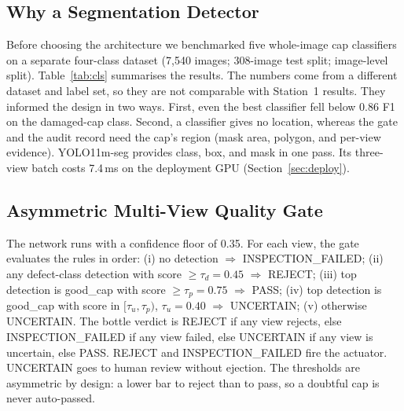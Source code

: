 \documentclass[conference]{IEEEtran}
\begin{document}
\subsection{Why a Segmentation Detector}
Before choosing the architecture we benchmarked five whole-image cap classifiers on a separate four-class dataset (7{,}540 images; 308-image test split; image-level split). Table~\ref{tab:cls} summarises the results. The numbers come from a different dataset and label set, so they are not comparable with Station~1 results. They informed the design in two ways. First, even the best classifier fell below 0.86 F1 on the damaged-cap class. Second, a classifier gives no location, whereas the gate and the audit record need the cap's region (mask area, polygon, and per-view evidence). YOLO11m-seg provides class, box, and mask in one pass. Its three-view batch costs 7.4\,ms on the deployment GPU (Section~\ref{sec:deploy}).

\begin{table}[t]
\caption{Preliminary whole-image cap classifiers (separate 4-class dataset, $N_{\mathrm{test}}{=}308$). GPU: PyTorch, batch 1; CPU: ONNX Runtime INT8.}
\label{tab:cls}
\centering
\setlength{\tabcolsep}{3pt}
\end{table}

\subsection{Asymmetric Multi-View Quality Gate}
\label{sec:gate}
The network runs with a confidence floor of 0.35. For each view, the gate evaluates the rules in order:
(i) no detection $\Rightarrow$ INSPECTION\_FAILED;
(ii) any defect-class detection with score $\geq\tau_d{=}0.45$ $\Rightarrow$ REJECT;
(iii) top detection is good\_cap with score $\geq\tau_p{=}0.75$ $\Rightarrow$ PASS;
(iv) top detection is good\_cap with score in $[\tau_u, \tau_p)$, $\tau_u{=}0.40$ $\Rightarrow$ UNCERTAIN;
(v) otherwise UNCERTAIN.
The bottle verdict is REJECT if any view rejects, else INSPECTION\_FAILED if any view failed, else UNCERTAIN if any view is uncertain, else PASS. REJECT and INSPECTION\_FAILED fire the actuator. UNCERTAIN goes to human review without ejection. The thresholds are asymmetric by design: a lower bar to reject than to pass, so a doubtful cap is never auto-passed.
\end{document}
